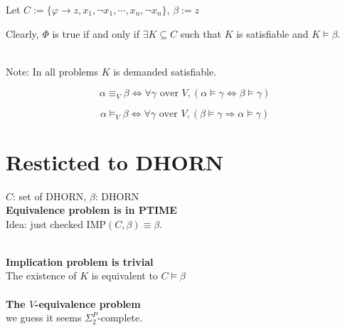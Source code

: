 \documentclass[12pt]{article}
\begin{document}
{Let $C:=\{\varphi\rightarrow z, x_1,\neg x_1,\cdots, x_n,\neg x_n\}$, $\beta:=z$

Clearly, $\Phi$ is true if and only if $\exists K\subseteq C$ such that $K$ is satisfiable and $K\models \beta$.


\ \\ 

Note: In all problems $K$ is demanded satisfiable.

$$\alpha \equiv_V \beta \Longleftrightarrow \forall \gamma \mbox{ over } V, (\alpha\models \gamma \Leftrightarrow \beta\models \gamma) $$

$$\alpha \models_V \beta \Longleftrightarrow \forall \gamma \mbox{ over } V, (\beta\models \gamma \Longrightarrow \alpha\models \gamma) $$










\section{Resticted to DHORN}

$C$: set of DHORN, $\beta$: DHORN \\

{\bf Equivalence problem is in PTIME} \\

Idea: just checked IMP$(C,\beta)\equiv \beta$. 




\ \\

{\bf Implication problem is trivial} \\ 

The existence of $K$ is equivalent to $C\models\beta$\\

\ \\


{\bf The $V$-equivalence problem}\\



we guess it seems $\Sigma_2^P$-complete.

}
\end{document}
